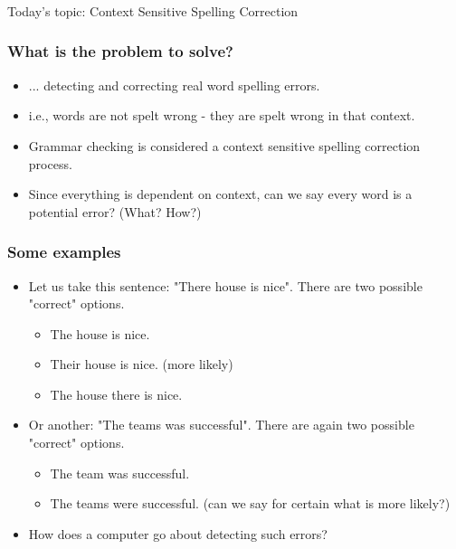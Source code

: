 \documentclass{beamer}
\begin{document}
\begin{frame}
\frametitle{}
\begin{center}
\Large Today's topic: Context Sensitive Spelling Correction
\end{center}
\end{frame}

\begin{frame}
\frametitle{What is the problem to solve?}
\begin{itemize}
\item ... detecting and correcting real word spelling errors.
\item i.e., words are not spelt wrong - they are spelt wrong in that context.
\item Grammar checking is considered a context sensitive spelling correction process.
\item Since everything is dependent on context, can we say every word is a potential error? (What? How?)
\end{itemize}
\end{frame}

\begin{frame}
\frametitle{Some examples}
\begin{itemize}
\item Let us take this sentence: "There house is nice". There are two possible "correct" options.
\begin{itemize}
\item The house is nice.
\item Their house is nice. (more likely)
\item The house there is nice. 
\end{itemize}
\item Or another: "The teams was successful". There are again two possible "correct" options.
\begin{itemize}
\item The team was successful.
\item The teams were successful. (can we say for certain what is more likely?)
\end{itemize}
\item How does a computer go about detecting such errors?
\end{itemize}
\end{frame}
\end{document}
